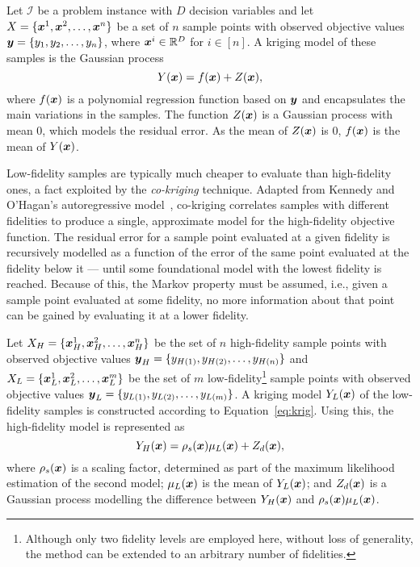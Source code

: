 Let $\mathcal{I}$ be a problem instance with $D$ decision variables and let $X = \{\boldsymbol{x}^1,\boldsymbol{x}^2,\dots,\boldsymbol{x}^n\}$ be a set of $n$ sample points with observed objective values $\boldsymbol{y} = \{y_1,y_2,\dots,y_n\}$, where $\boldsymbol{x}^i \in \mathbb{R}^D$ for $i \in [n]$. A kriging model of these samples is the Gaussian process 
\begin{equation}
Y(\boldsymbol{x}) = f(\boldsymbol{x}) + Z(\boldsymbol{x}),\label{eq:krig}
\end{equation}
where $f(\boldsymbol{x})$ is a polynomial regression function based on $\boldsymbol{y}$ and encapsulates the main variations in the samples. The function $Z(\boldsymbol{x})$ is a Gaussian process with mean $0$, which models the residual error. As the mean of $Z(\boldsymbol{x})$ is 0, $f(\boldsymbol{x})$ is the mean of $Y(\boldsymbol{x})$. 

Low-fidelity samples are typically much cheaper to evaluate than high-fidelity ones, a fact exploited by the \emph{co-kriging} technique. Adapted from Kennedy and O'Hagan's autoregressive model~\cite{kennedy2000predicting}, co-kriging correlates samples with different fidelities to produce a single, approximate model for the high-fidelity objective function. The residual error for a sample point evaluated at a given fidelity is recursively modelled as a function of the error of the same point evaluated at the fidelity below it --- until some foundational model with the lowest fidelity is reached. Because of this, the Markov property must be assumed, i.e., given a sample point evaluated at some fidelity, no more information about that point can be gained by evaluating it at a lower fidelity.

Let $X_H = \{\boldsymbol{x}_H^1,\boldsymbol{x}_H^2,\dots,\boldsymbol{x}_H^n\}$ be the set of $n$ high-fidelity sample points with observed objective values $\boldsymbol{y}_H = \{y_{H(1)},y_{H(2)},\dots,y_{H(n)}\}$ and $X_L = \{\boldsymbol{x}_L^1,\boldsymbol{x}_L^2,\dots,\boldsymbol{x}_L^m\}$ be the set of $m$ low-fidelity\footnote{Although only two fidelity levels are employed here, without loss of generality, the method can be extended to an arbitrary number of fidelities.} sample points with observed objective values $\boldsymbol{y}_L = \{y_{L(1)},y_{L(2)},\dots,y_{L(m)}\}$. A kriging model $Y_L(\boldsymbol{x})$ of the low-fidelity samples is constructed according to Equation~\ref{eq:krig}. Using this, the high-fidelity model is represented as
\begin{equation}
Y_H(\boldsymbol{x}) = \rho_s(\boldsymbol{x})\mu_L(\boldsymbol{x}) + Z_d(\boldsymbol{x}),
\end{equation} 
where $\rho_s(\boldsymbol{x})$ is a scaling factor, determined as part of the maximum likelihood estimation of the second model; $\mu_L(\boldsymbol{x})$ is the mean of $Y_L(\boldsymbol{x})$; and $Z_d(\boldsymbol{x})$ is a Gaussian process modelling the difference between $Y_H(\boldsymbol{x})$ and $\rho_s(\boldsymbol{x})\mu_L(\boldsymbol{x})$.

